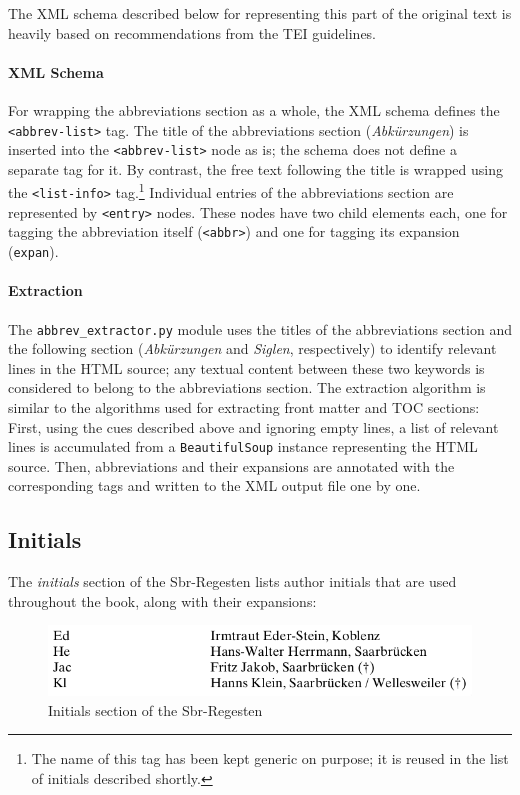 The XML schema described below for representing this part of the
original text is heavily based on recommendations from the TEI
guidelines.

\paragraph{XML Schema}

For wrapping the abbreviations section as a whole, the XML schema
defines the \texttt{<abbrev-list>} tag. The title of the abbreviations
section (\emph{Abkürzungen}) is inserted into the
\texttt{<abbrev-list>} node as is; the schema does not define a
separate tag for it. By contrast, the free text following the title is
wrapped using the \texttt{<list-info>} tag.\footnote{The name of this
  tag has been kept generic on purpose; it is reused in the list of
  initials described shortly.} Individual entries of the abbreviations
section are represented by \texttt{<entry>} nodes. These nodes have
two child elements each, one for tagging the abbreviation itself
(\texttt{<abbr>}) and one for tagging its expansion (\texttt{expan}).

\paragraph{Extraction}

The \texttt{abbrev\_extractor.py} module uses the titles of the
abbreviations section and the following section (\emph{Abkürzungen}
and \emph{Siglen}, respectively) to identify relevant lines in the
HTML source; any textual content between these two keywords is
considered to belong to the abbreviations section. The extraction
algorithm is similar to the algorithms used for extracting front
matter and TOC sections: First, using the cues described above and
ignoring empty lines, a list of relevant lines is accumulated from a
\texttt{BeautifulSoup} instance representing the HTML source. Then,
abbreviations and their expansions are annotated with the
corresponding tags and written to the XML output file one by one.

\subsection{Initials}
\label{sec:initials}

The \emph{initials} section of the Sbr-Regesten lists author initials
that are used throughout the book, along with their expansions:

\begin{figure}[h]
  \centering
  \includegraphics[width=1.0\textwidth]{img/initials}
  \caption{Initials section of the Sbr-Regesten}
  \label{fig:initials}
\end{figure}

